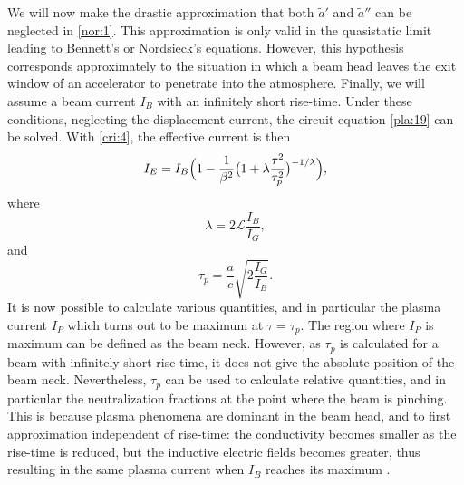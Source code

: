 \documentclass [12pt,a4paper,     ]{report} %
\begin{document}
	We will now make the drastic approximation that both $\tilde{a}'$ and $\tilde{a}''$ can be neglected in \eqref{nor:1}.  This approximation is only valid in the quasistatic limit leading to Bennett's or Nordsieck's equations.  However, this hypothesis corresponds approximately to the situation in which a beam head leaves the exit window of an accelerator to penetrate into the atmosphere.  Finally, we will assume a beam current $I_B$ with an infinitely short rise-time.  Under these conditions, neglecting the displacement current, the circuit equation \eqref{pla:19} can be solved.  With \eqref{cri:4}, the effective current is then
%
\begin{equation}\label{cri:5} %
   I_E = I_B \Bigl( 1 - \frac{1}{\beta^2}
             \bigl(1+\lambda\frac{\tau^2}{\tau_p^2}\bigr)^{-1/\lambda} \Bigr),
\end{equation}
%
where
%
\begin{equation}\label{cri:6} %
      \lambda = 2 \mathcal{L} \frac{I_B}{I_G},
\end{equation}
%
and
%
\begin{equation}\label{cri:7} %
     \tau_p = \frac{a}{c}  \sqrt{2 \frac{I_G}{I_B} }.
\end{equation}
%
It is now possible to calculate various quantities, and in particular the plasma current $I_P$ which turns out to be maximum at $\tau=\tau_p$.  The region where $I_P$ is maximum can be defined as the beam neck.  However, as $\tau_p$ is calculated for a beam with infinitely short rise-time, it does not give the absolute position of the beam neck.  Nevertheless, $\tau_p$ can be used to calculate relative quantities, and in particular the neutralization fractions at the point where the beam is pinching.  This is because plasma phenomena are dominant in the beam head, and to first approximation independent of rise-time: the conductivity becomes smaller as the rise-time is reduced, but the inductive electric fields becomes greater, thus resulting in the same plasma current when $I_B$ reaches its maximum \cite{BRIGG1974-}.
\end{document}
